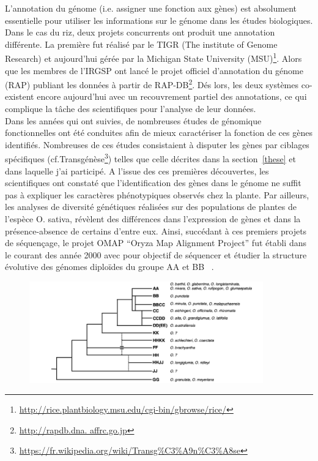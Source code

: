 L'annotation du génome (i.e. assigner une fonction aux gènes) est absolument essentielle pour utiliser les informations sur le génome dans les études biologiques. Dans le cas du riz, deux projets concurrents ont produit une annotation différente. La première fut réalisé par le TIGR (The institute of Genome Research) et aujourd'hui gérée par la Michigan State University (MSU)\footnote{\url{http://rice.plantbiology.msu.edu/cgi-bin/gbrowse/rice/}}. Alors que les membres de l'IRGSP ont lancé le projet officiel d'annotation du génome (RAP) publiant les données à partir de RAP-DB\footnote{\url{http://rapdb.dna. affrc.go.jp}}. Dés lors, les deux systèmes co-existent encore aujourd'hui avec un recouvrement partiel des annotations, ce qui complique la tâche des scientifiques pour l'analyse de leur données.\\

Dans les années qui ont suivies, de nombreuses études de génomique fonctionnelles ont été conduites afin de mieux caractériser la fonction de ces gènes identifiés. Nombreuses de ces études consistaient à disputer les gènes par ciblages spécifiques (cf.Transgénèse\footnote{\url{https://fr.wikipedia.org/wiki/Transg\%C3\%A9n\%C3\%A8se}}) telles que celle décrites dans la section~\ref{these} et dans laquelle j'ai participé. A l'issue des ces premières découvertes, les scientifiques ont constaté que l'identification des gènes dans le génome ne suffit pas à expliquer les caractères phénotypiques observés chez la plante.  Par ailleurs, les analyses de diversité génétiques réalisées sur des populations de plantes de l'espèce O. sativa, révèlent des différences dans l'expression de gènes et dans la présence-absence de certains d'entre eux. Ainsi, succédant à ces premiers projets de séquençage, le projet OMAP “Oryza Map Alignment Project” fut établi dans le courant des année 2000 avec pour objectif de séquencer et étudier la structure évolutive des génomes diploïdes du groupe AA et BB ~\cite{wing2005}.\\ 

\begin{figure}[!ht]
    \centering
    \includegraphics[width=0.9\textwidth]{hdr_manuscript/Figures/pylogenetic-tree.png}
    \label{fig:genus}
\end{figure}

